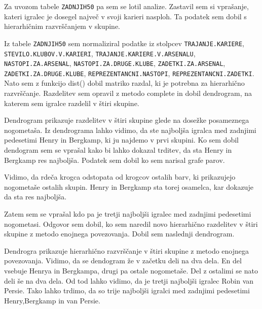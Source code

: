 \documentclass[11pt,a4paper]{article}
\begin{document}
Za uvozom tabele \verb|ZADNJIH50| pa sem se lotil analize. Zastavil sem si vprašanje, kateri igralec je dosegel največ v svoji karieri nasploh. Ta podatek sem dobil s hierarhičnim razvrščanjem v skupine.

Iz tabele \verb|ZADNJIH50| sem normaliziral podatke iz stolpcev \texttt{TRAJANJE.KA\-RI\-E\-RE}, \verb|STEVILO.KLUBOV.V.KARIERI|, \verb|TRAJANJE.KARIERE.V.ARSENALU|, \texttt{NA\-STO\-PI.ZA.ARSENAL}, \verb|NASTOPI.ZA.DRUGE.KLUBE|, \verb|ZADETKI.ZA.ARSENAL|,  \texttt{ZA\-DE\-TKI.ZA.DRUGE.KLUBE}, \verb|REPREZENTANCNI.NASTOPI|, \texttt{REPREZENTANCNI.ZA\-DE\-TKI}. Nato sem z funkcijo dist() dobil matriko razdal, ki je potrebna za hierarhično razvrščanje. Razdelitev sem opravil z metodo complete in dobil dendrogram, na katerem sem igralce razdelil v štiri skupine.


Dendrogram  prikazuje razdelitev v štiri skupine glede na dosežke posameznega nogometaša.
Iz dendrograma lahko vidimo, da ste najboljša igralca med zadnjimi pedesetimi Henry in Bergkamp, ki ju najdemo v prvi skupini. 
\newpage
\indent Ko sem dobil dendogram sem se vprašal kako bi lahko dokazal trditev, da sta Henry in Bergkamp res najboljša. Podatek sem dobil ko sem narisal grafe parov.


Vidimo, da rdeča krogca odstopata od krogcov ostalih barv, ki prikazujejo nogometaše ostalih skupin. Henry in Bergkamp sta torej osamelca, kar dokazuje da sta res najboljša.
\newpage

Zatem sem se vprašal kdo pa je tretji najboljši igralec med zadnjimi pedesetimi nogometasi. Odgovor sem dobil, ko sem naredil novo hierarhično razdelitev v štiri skupine z metodo enojnega povezovanja. Dobil sem naslednji dendrogram.


Dendrogra prikazuje hierarhično razvrščanje v štiri skupine z metodo enojnega povezovanja. Vidimo, da se dendogram že v začetku deli na dva dela. En del vsebuje Henrya in Bergkampa, drugi pa ostale nogometaše. Del z ostalimi se nato deli še na dva dela. Od tod lahko vidimo, da je tretji najboljši igralec Robin van Persie. Tako lahko trdimo, da so trije najboljši igralci med zadnjimi pedesetimi Henry,Bergkamp in van Persie.
\end{document}

